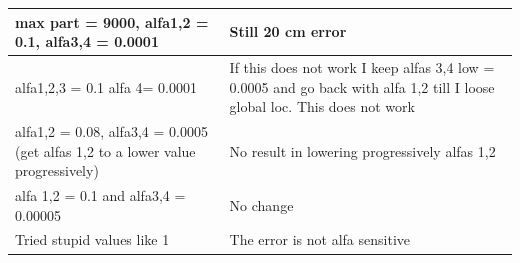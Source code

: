 \documentclass[11pt,a4paper]{article}
\begin{document}
\begin{center}
\begin{tabular}{| m{12em} | m{13em}|}
\hline
max part = 9000, alfa1,2 = 0.1,  alfa3,4 = 0.0001 & Still 20 cm error \\
\hline
alfa1,2,3 = 0.1 alfa 4= 0.0001 & If this does not work I keep alfas 3,4 low = 0.0005 and go back with alfa 1,2 till I loose global loc. This does not work\\
\hline
alfa1,2 = 0.08, alfa3,4 = 0.0005 (get alfas 1,2 to a lower value progressively) & No result in lowering progressively alfas 1,2\\ 
\hline
alfa 1,2 = 0.1 and alfa3,4 = 0.00005 & No change\\
\hline
Tried stupid values like 1 & The error is not alfa sensitive \\
\hline
\end{tabular}
\end{center}






\end{document}

